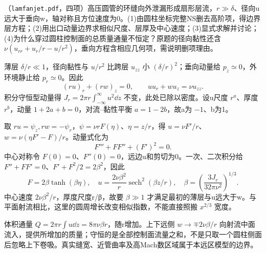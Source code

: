 \begin{exercise}\label{task:fluid-fanjet}
（\texttt{lamfanjet.pdf}，四项）高压圆管的环缝向外泄漏形成扇形层流，$r\gg\delta$、径向u远大于垂向w，轴对称且方位速度为0。(1)由圆柱坐标完整NS删去高阶项，得边界层方程；(2)用出口动量边界求相似尺度、层厚及中心速度；(3)显式求解并讨论；(4)为什么穿过圆柱控制面的总质量通量不恒定？原题的径向黏性还含 $\nu(u_{rr}+u_r/r-u/r^2)$，垂向方程含相应几何项，需说明删项理由。
\end{exercise}
\begin{solution}
薄层 $\delta/r\ll1$，径向黏性与 $u/r^2$ 比跨层 $u_{zz}$ 小 $(\delta/r)^2$；垂向动量给 $p_z\simeq0$，外环境静止给 $p_r\simeq0$。因此
\[
 (ru)_r+(rw)_z=0,\qquad uu_r+wu_z=\nu u_{zz}.
\]
积分守恒型动量得 $J_r=2\pi r\int_{-\infty}^{\infty}u^2\dd z$ 不变，此处已除以密度。设u尺度 $r^a$、厚度 $r^b$，动量 $1+2a+b=0$，对流--黏性平衡 $a=1-2b$，故a为 $-1$、b为1。

取 $ru=\psi_z,rw=-\psi_r$，$\psi=\nu rF(\eta)$、$\eta=z/r$，得 $u=\nu F'/r$、$w=\nu(\eta F'-F)/r$。动量式化为
\[
 F'''+FF''+(F')^2=0.
\]
中心对称令 $F(0)=0$、$F''(0)=0$，远边u和剪切为0。一次、二次积分给 $F''+FF'=0$、$F'+F^2/2=2\beta^2$，因此
\[
 F=2\beta\tanh(\beta\eta),\quad
 u=\frac{2\nu\beta^2}{r}\operatorname{sech}^2(\beta z/r),\quad
 \beta=\left(\frac{3J_r}{32\pi\nu^2}\right)^{1/3}.
\]
中心速度 $2\nu\beta^2/r$，厚度尺度r/β，故要 $\beta\gg1$ 才满足最初的薄层与u远大于w。与平面射流相比，这里的圆周增长改变相似指数，不能直接照搬 $x^{2/3}$ 宽度。

体积通量 $Q=2\pi r\int u\dd z=8\pi\nu\beta r$，随r增加。上下远侧 $w\to\mp2\nu\beta/r$ 向射流中面流入，提供所增加的质量；守恒的是全部控制面流量之和，不是只取一个圆柱侧面后忽略上下卷吸。真实缝宽、近管曲率及高Mach数区域属于本远区模型的边界。
\end{solution}
